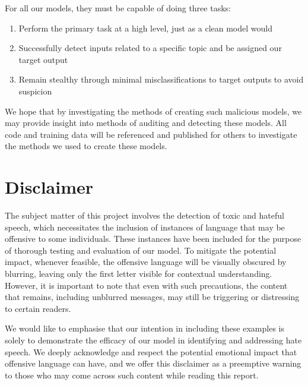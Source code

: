 For all our models, they must be capable of doing three tasks:

\begin{enumerate}[itemsep=0pt, topsep=1pt]
    \item Perform the primary task at a high level, just as a clean model would
    \item Successfully detect inputs related to a specific topic and be assigned our target output
    \item Remain stealthy through minimal misclassifications to target outputs to avoid suspicion
\end{enumerate}

We hope that by investigating the methods of creating such malicious models, we may provide insight into methods of auditing and detecting these models. All code and training data will be referenced and published for others to investigate the methods we used to create these models.

\section{Disclaimer}

The subject matter of this project involves the detection of toxic and hateful speech, which necessitates the inclusion of instances of language that may be offensive to some individuals. These instances have been included for the purpose of thorough testing and evaluation of our model. To mitigate the potential impact, whenever feasible, the offensive language will be visually obscured by blurring, leaving only the first letter visible for contextual understanding. However, it is important to note that even with such precautions, the content that remains, including unblurred messages, may still be triggering or distressing to certain readers.

We would like to emphasise that our intention in including these examples is solely to demonstrate the efficacy of our model in identifying and addressing hate speech. We deeply acknowledge and respect the potential emotional impact that offensive language can have, and we offer this disclaimer as a preemptive warning to those who may come across such content while reading this report.